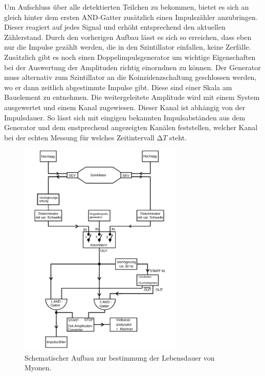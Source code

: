 Um Aufschluss über alle detektierten Teilchen zu bekommen, bietet es sich an gleich hinter dem ersten AND-Gatter zusätzlich einen Impulszähler anzubringen. 
Dieser reagiert auf jedes Signal und erhöht entsprechend den aktuellen Zählerstand. Durch den vorherigen Aufbau lässt es sich so erreichen, dass eben nur die Impulse gezählt werden, die 
in den Szintillator einfallen, keine Zerfälle.
\\
\newline
Zusätzlich gibt es noch einen Doppelimpulsgenerator um wichtige Eigenschaften bei der Auswertung der Amplituden 
richtig einorndnen zu können. Der Generator muss alternativ zum Szintillator an die Koinzidenzschaltung geschlossen werden,
wo er dann zeitlich abgestimmte Impulse gibt. Diese sind einer Skala am Bauelement zu entnehmen. 
Die weitergeleitete Amplitude wird mit einem System ausgewertet und einem Kanal zugewiesen. Dieser Kanal ist abhängig 
von der Impulsdauer. So lässt sich mit eingigen bekannten Impulsabständen aus dem Generator und dem enstprechend angezeigten Kanälen
feststellen, welcher Kanal bei der echten Messung für welches Zeitintervall $\increment T$ steht.











\begin{figure}
    \centering
    \includegraphics[width=0.7\textwidth]{bilder/aufbau.png}
    \caption{Schematischer Aufbau zur bestimmung der Lebensdauer von Myonen. \cite{skript}} 
    \label{fig:1}
\end{figure}